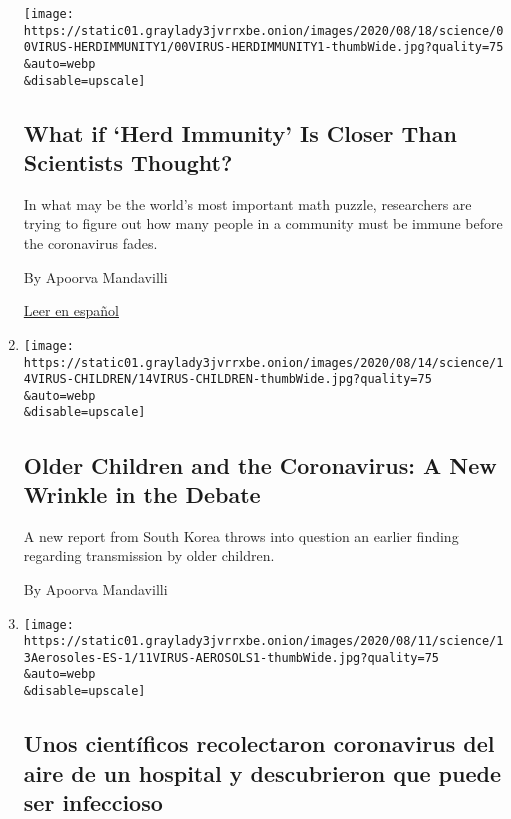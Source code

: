 \begin{enumerate}
  \texttt{[image: https://static01.graylady3jvrrxbe.onion/images/2020/08/18/science/00VIRUS-HERDIMMUNITY1/00VIRUS-HERDIMMUNITY1-thumbWide.jpg?quality=75\\\&auto=webp\\\&disable=upscale]}

  \hypertarget{what-if-herd-immunity-is-closer-than-scientists-thought}{%
  \subsection{What if `Herd Immunity' Is Closer Than Scientists
  Thought?}\label{what-if-herd-immunity-is-closer-than-scientists-thought}}

  In what may be the world's most important math puzzle, researchers are
  trying to figure out how many people in a community must be immune
  before the coronavirus fades.

  By Apoorva Mandavilli

  \href{https://www.nytimes3xbfgragh.onion/es/2020/08/18/espanol/ciencia-y-tecnologia/inmunidad-rebano-coronavirus.html}{Leer
  en español}
\item
  \href{/2020/08/14/health/older-children-and-the-coronavirus-a-new-wrinkle-in-the-debate.html}{}

  \texttt{[image: https://static01.graylady3jvrrxbe.onion/images/2020/08/14/science/14VIRUS-CHILDREN/14VIRUS-CHILDREN-thumbWide.jpg?quality=75\\\&auto=webp\\\&disable=upscale]}

  \hypertarget{older-children-and-the-coronavirus-a-new-wrinkle-in-the-debate}{%
  \subsection{Older Children and the Coronavirus: A New Wrinkle in the
  Debate}\label{older-children-and-the-coronavirus-a-new-wrinkle-in-the-debate}}

  A new report from South Korea throws into question an earlier finding
  regarding transmission by older children.

  By Apoorva Mandavilli
\item
  \href{/es/2020/08/13/espanol/coronavirus-en-aire.html}{}

  \texttt{[image: https://static01.graylady3jvrrxbe.onion/images/2020/08/11/science/13Aerosoles-ES-1/11VIRUS-AEROSOLS1-thumbWide.jpg?quality=75\\\&auto=webp\\\&disable=upscale]}

  \hypertarget{unos-cientuxedficos-recolectaron-coronavirus-del-aire-de-un-hospital-y-descubrieron-que-puede-ser-infeccioso}{%
  \subsection{Unos científicos recolectaron coronavirus del aire de un
  hospital y descubrieron que puede ser
  infeccioso}\label{unos-cientuxedficos-recolectaron-coronavirus-del-aire-de-un-hospital-y-descubrieron-que-puede-ser-infeccioso}}


\end{enumerate}
